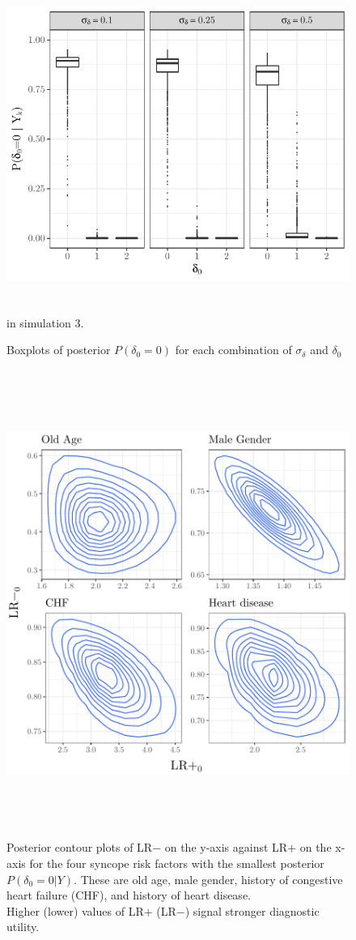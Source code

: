 \documentclass[AMA,STIX1COL]{WileyNJD-v2}
\begin{document}
\begin{figure}
\includegraphics[height = 4in, width = 5in]{spike_boxplot.pdf}
\caption{Boxplots of posterior $P(\delta_0 = 0)$ for each combination of $\sigma_\delta$ and $\delta_0$} in simulation 3. 
\label{fig:SSP-boxplot}
\end{figure}

\begin{figure}
\includegraphics[height = 6in, width = 6in]{syncope_contour.pdf}
\caption{Posterior contour plots of LR$-$ on the y-axis against LR$+$ on the x-axis for the four syncope risk factors with the smallest posterior $P(\delta_0 = 0 \vert Y)$. 
These are old age, male gender, history of congestive heart failure (CHF), and history of heart disease. \\
Higher (lower) values of LR$+$ (LR$-$) signal stronger diagnostic utility.}
\label{fig:syncope_contour}
\end{figure}
\end{document}
